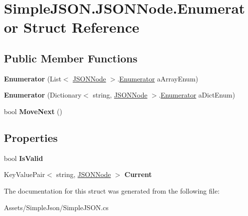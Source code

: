 \hypertarget{structSimpleJSON_1_1JSONNode_1_1Enumerator}{}\section{Simple\+J\+S\+O\+N.\+J\+S\+O\+N\+Node.\+Enumerator Struct Reference}
\label{structSimpleJSON_1_1JSONNode_1_1Enumerator}
\subsection*{Public Member Functions}
\begin{DoxyCompactItemize}
\item 
{\bfseries Enumerator} (List$<$ \hyperlink{classSimpleJSON_1_1JSONNode}{J\+S\+O\+N\+Node} $>$.\hyperlink{structSimpleJSON_1_1JSONNode_1_1Enumerator}{Enumerator} a\+Array\+Enum)\hypertarget{structSimpleJSON_1_1JSONNode_1_1Enumerator_ae284b12010d8a1df413040ce738d9f43}{}\label{structSimpleJSON_1_1JSONNode_1_1Enumerator_ae284b12010d8a1df413040ce738d9f43}

\item 
{\bfseries Enumerator} (Dictionary$<$ string, \hyperlink{classSimpleJSON_1_1JSONNode}{J\+S\+O\+N\+Node} $>$.\hyperlink{structSimpleJSON_1_1JSONNode_1_1Enumerator}{Enumerator} a\+Dict\+Enum)\hypertarget{structSimpleJSON_1_1JSONNode_1_1Enumerator_ac1e171706bac1b83a369e0c75d9f41b4}{}\label{structSimpleJSON_1_1JSONNode_1_1Enumerator_ac1e171706bac1b83a369e0c75d9f41b4}

\item 
bool {\bfseries Move\+Next} ()\hypertarget{structSimpleJSON_1_1JSONNode_1_1Enumerator_a0e0ae1411677cc0042b5ed8389b7305b}{}\label{structSimpleJSON_1_1JSONNode_1_1Enumerator_a0e0ae1411677cc0042b5ed8389b7305b}

\end{DoxyCompactItemize}
\subsection*{Properties}
\begin{DoxyCompactItemize}
\item 
bool {\bfseries Is\+Valid}\hypertarget{structSimpleJSON_1_1JSONNode_1_1Enumerator_a76ddaa34c7f9b13ce4291eca03d3bb45}{}\label{structSimpleJSON_1_1JSONNode_1_1Enumerator_a76ddaa34c7f9b13ce4291eca03d3bb45}

\item 
Key\+Value\+Pair$<$ string, \hyperlink{classSimpleJSON_1_1JSONNode}{J\+S\+O\+N\+Node} $>$ {\bfseries Current}\hypertarget{structSimpleJSON_1_1JSONNode_1_1Enumerator_ac6364c2c1225c51855be11e6a3df4d2e}{}\label{structSimpleJSON_1_1JSONNode_1_1Enumerator_ac6364c2c1225c51855be11e6a3df4d2e}

\end{DoxyCompactItemize}


The documentation for this struct was generated from the following file\+:\begin{DoxyCompactItemize}
\item 
Assets/\+Simple\+Json/Simple\+J\+S\+O\+N.\+cs\end{DoxyCompactItemize}
